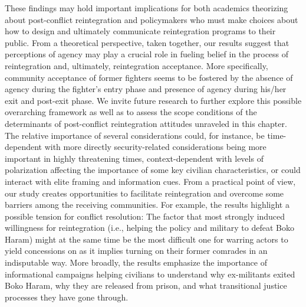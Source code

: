 These findings may hold important implications for both academics theorizing about post-conflict reintegration and policymakers who must make choices about how to design and ultimately communicate reintegration programs to their public. From a theoretical perspective, taken together, our results suggest that perceptions of agency may play a crucial role in fueling belief in the process of reintegration and, ultimately, reintegration acceptance. More specifically, community acceptance of former fighters seems to be fostered by the absence of agency during the fighter's entry phase and presence of agency during his/her exit and post-exit phase. We invite future research to further explore this possible overarching framework as well as to assess the scope conditions of the determinants of post-conflict reintegration attitudes unraveled in this chapter. The relative importance of several considerations could, for instance, be time-dependent with more directly security-related considerations being more important in highly threatening times, context-dependent with levels of polarization affecting the importance of some key civilian characteristics, or could interact with elite framing and information cues. From a practical point of view, our study creates opportunities to facilitate reintegration and overcome some barriers among the receiving communities. For example, the results highlight a possible tension for conflict resolution: The factor that most strongly induced willingness for reintegration (i.e., helping the policy and military to defeat Boko Haram) might at the same time be the most difficult one for warring actors to yield concessions on as it implies turning on their former comrades in an indisputable way. More broadly, the results emphasize the importance of informational campaigns helping civilians to understand why ex-militants exited Boko Haram, why they are released from prison, and what transitional justice processes they have gone through.


